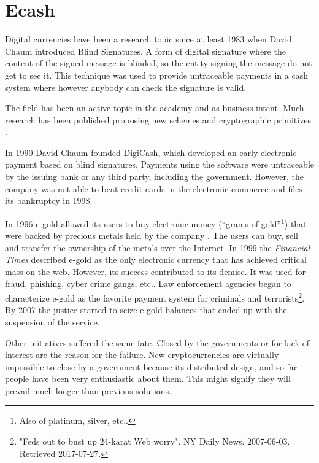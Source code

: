 \section{Ecash}
Digital currencies have been a research topic since at least 1983 when David
  Chaum \cite{chaum1983blind} introduced Blind Signatures. A form of digital
  signature where the content of the signed message is blinded, so the entity
  signing the message do not get to see it. This technique was used to provide
  untraceable payments in a cash system where however anybody can check the
  signature is valid.

The field has been an active topic in the academy and as business intent.
  Much research has been published proposing new schemes and
  cryptographic primitives \cite{okamoto1991universal,chaum1992achieving,
  boly1994esprit,anderson1996netcard,lysyanskaya1998group}.

In 1990 David Chaum founded DigiCash, which developed an early electronic
  payment based on blind signatures. Payments using the software were
  untraceable by the issuing bank or any third party, including the government.
However, the company was not able to beat credit cards in the electronic
  commerce and files its bankruptcy in 1998.

In 1996 e-gold allowed its users to buy electronic money (``grams of
  gold''\footnote{Also of platinum, silver, etc..}) that were backed by precious
  metals held by the company \cite{hughes2007developments}.
The users can buy, sell and transfer the ownership of the metals over the
  Internet. In 1999 the \textit{Financial Times} described e-gold as the only
  electronic currency that has achieved critical mass on the web.
However, its success contributed to its demise. It was used for fraud, phishing,
  cyber crime gangs, etc.. Law enforcement agencies began to characterize
  e-gold as the favorite payment system for criminals and terrorists\footnote{%
  "Feds out to bust up 24-karat Web worry". NY Daily News. 2007-06-03. Retrieved
  2017-07-27.}. By 2007 the justice started to seize e-gold balances that ended up
  with the suspension of the service.

Other initiatives suffered the same fate.
Closed by the governments or for lack of interest are the reason for the
  failure.
New cryptocurrencies are virtually impossible to close by a government because
  its distributed design, and so far people have been very enthusiastic about
  them.
This might signify they will prevail much longer than previous solutions.
